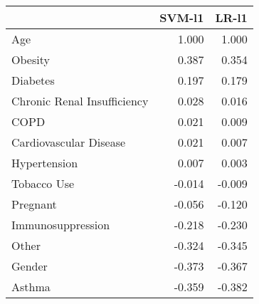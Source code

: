 \begin{tabular}{lrr}
\toprule
{} &  SVM-l1 &  LR-l1 \\
\midrule
Age                         &   1.000 &  1.000 \\
Obesity                     &   0.387 &  0.354 \\
Diabetes                    &   0.197 &  0.179 \\
Chronic Renal Insufficiency &   0.028 &  0.016 \\
COPD                        &   0.021 &  0.009 \\
Cardiovascular Disease      &   0.021 &  0.007 \\
Hypertension                &   0.007 &  0.003 \\
Tobacco Use                 &  -0.014 & -0.009 \\
Pregnant                    &  -0.056 & -0.120 \\
Immunosuppression           &  -0.218 & -0.230 \\
Other                       &  -0.324 & -0.345 \\
Gender                      &  -0.373 & -0.367 \\
Asthma                      &  -0.359 & -0.382 \\
\bottomrule
\end{tabular}
